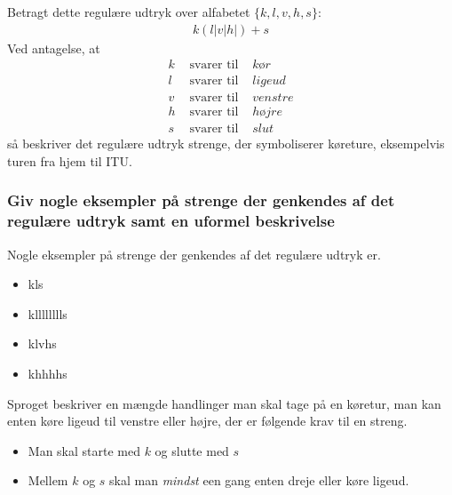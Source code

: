 Betragt dette regulære udtryk over alfabetet $\{k,l,v,h,s\}$:
\begin{align*}
    k(l|v|h|)+s
\end{align*}
Ved antagelse, at
\begin{align*}
    k & \text{ svarer til } & kør\\
    l & \text{ svarer til } & ligeud\\
    v & \text{ svarer til } & venstre\\
    h & \text{ svarer til } & højre\\
    s & \text{ svarer til } & slut
\end{align*}
så beskriver det regulære udtryk strenge, der symboliserer køreture, eksempelvis turen fra hjem til ITU.\@
\subsubsection{Giv nogle eksempler på strenge der genkendes af det regulære udtryk samt en uformel beskrivelse}
Nogle eksempler på strenge der genkendes af det regulære udtryk er.
\begin{itemize}
    \item kls
    \item klllllllls
    \item klvhs
    \item khhhhs
\end{itemize}
Sproget beskriver en mængde handlinger man skal tage på en køretur, man kan enten køre ligeud til venstre eller højre, der er følgende krav til en streng.
\begin{itemize}
    \item Man skal starte med $k$ og slutte med $s$
    \item Mellem $k$ og $s$ skal man \textit{mindst} een gang enten dreje eller køre ligeud.
\end{itemize}
